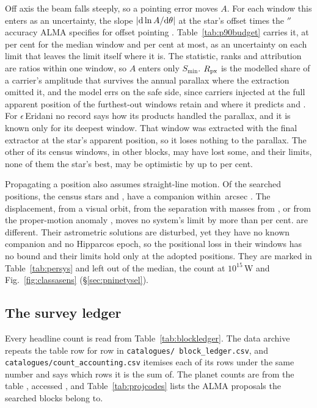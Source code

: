 Off axis the beam falls steeply, so a pointing error moves $A$. For each
window this enters as an uncertainty, the slope $|{\rm d}\ln A/{\rm d}\theta|$
at the star's offset times the \PtSigmaOff$''$ accuracy ALMA specifies for
offset pointing \citep{ALMAHandbook}. Table~\ref{tab:p90budget} carries it, at
\PtUncMedPct{} per cent for the median window and \PtUncMaxPct{} per
cent at most, as an uncertainty on each limit that leaves the limit itself
where it is. The statistic, ranks and
attribution are ratios within one window, so $A$ enters only $S_{\min}$.
$R_{\rm px}$ is the modelled share of a carrier's amplitude that survives the
annual parallax where the extraction omitted it, and the model errs on the
safe side, since carriers injected at the full apparent position of the
\SensNReextWin{} furthest-out windows retain \SensPxSmallMeas{} and
\SensPxLargeMeas{} where it predicts \SensPxSmallPred{} and
\SensPxLargePred. For $\epsilon$\,Eridani no record says how its
products handled the parallax, and it is known only for its deepest window.
That window was extracted with the final extractor at the star's apparent
position, so it loses nothing to the parallax. The other \EdPxNOmitWin{} of
its \BmEpsNCensus{} census windows, in \EdPxNOmitEb{} other blocks, may have
lost some, and their limits, none of them the star's best, may be
optimistic by up to \EdPxOmitBoundPct{} per cent.

Propagating a position also assumes straight-line motion. Of the
\OmNStar{} searched positions, the \OmNCensusStar{} census stars and
\CtUncatStar, \OmNComponent{} have a companion within
\OmRadius\,arcsec \citep{wds,orb6}. The displacement, from a visual orbit,
from the separation with masses from \citet{pecaut2013}, or from the
proper-motion anomaly \citep{kervella2022}, moves no system's limit by more
than \OmSysMovedMaxPct{} per cent. \OmFlagStars{} are different. Their
astrometric solutions are disturbed, yet they have no known companion and no
Hipparcos epoch, so the positional loss in their \OmNWinFlag{} windows has no
bound and their limits hold only at the adopted positions. They are marked
in Table~\ref{tab:persys} and left out of the median, the count at
$10^{15}$\,W and Fig.~\ref{fig:classasens} (\S\ref{sec:pninetysel}).

\subsection{The survey ledger}

Every headline count is read from Table~\ref{tab:blockledger}. The data
archive repeats the table row for row in \texttt{catalogues/\allowbreak
block\_ledger.csv}, and \texttt{catalogues/\allowbreak count\_accounting.csv}
itemises each of its rows under the same number and says which rows it is
the sum of. The planet counts are
from the \SfHostCatalogue{} \SfHostTable{} table \citep{NEA2013}, accessed
\SfHostDate, and Table~\ref{tab:projcodes} lists the ALMA proposals the
searched blocks belong to. 

